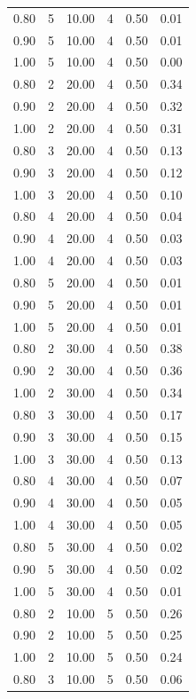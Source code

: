 \documentclass[12pt]{article}
\begin{document}
{\begin{longtable}{cccccc}
  0.80 &   5 & 10.00 &   4 & 0.50 & 0.01 \\ 
  0.90 &   5 & 10.00 &   4 & 0.50 & 0.01 \\ 
  1.00 &   5 & 10.00 &   4 & 0.50 & 0.00 \\ 
  0.80 &   2 & 20.00 &   4 & 0.50 & 0.34 \\ 
  0.90 &   2 & 20.00 &   4 & 0.50 & 0.32 \\ 
  1.00 &   2 & 20.00 &   4 & 0.50 & 0.31 \\ 
  0.80 &   3 & 20.00 &   4 & 0.50 & 0.13 \\ 
  0.90 &   3 & 20.00 &   4 & 0.50 & 0.12 \\ 
  1.00 &   3 & 20.00 &   4 & 0.50 & 0.10 \\ 
  0.80 &   4 & 20.00 &   4 & 0.50 & 0.04 \\ 
  0.90 &   4 & 20.00 &   4 & 0.50 & 0.03 \\ 
  1.00 &   4 & 20.00 &   4 & 0.50 & 0.03 \\ 
  0.80 &   5 & 20.00 &   4 & 0.50 & 0.01 \\ 
  0.90 &   5 & 20.00 &   4 & 0.50 & 0.01 \\ 
  1.00 &   5 & 20.00 &   4 & 0.50 & 0.01 \\ 
  0.80 &   2 & 30.00 &   4 & 0.50 & 0.38 \\ 
  0.90 &   2 & 30.00 &   4 & 0.50 & 0.36 \\ 
  1.00 &   2 & 30.00 &   4 & 0.50 & 0.34 \\ 
  0.80 &   3 & 30.00 &   4 & 0.50 & 0.17 \\ 
  0.90 &   3 & 30.00 &   4 & 0.50 & 0.15 \\ 
  1.00 &   3 & 30.00 &   4 & 0.50 & 0.13 \\ 
  0.80 &   4 & 30.00 &   4 & 0.50 & 0.07 \\ 
  0.90 &   4 & 30.00 &   4 & 0.50 & 0.05 \\ 
  1.00 &   4 & 30.00 &   4 & 0.50 & 0.05 \\ 
  0.80 &   5 & 30.00 &   4 & 0.50 & 0.02 \\ 
  0.90 &   5 & 30.00 &   4 & 0.50 & 0.02 \\ 
  1.00 &   5 & 30.00 &   4 & 0.50 & 0.01 \\ 
  0.80 &   2 & 10.00 &   5 & 0.50 & 0.26 \\ 
  0.90 &   2 & 10.00 &   5 & 0.50 & 0.25 \\ 
  1.00 &   2 & 10.00 &   5 & 0.50 & 0.24 \\ 
  0.80 &   3 & 10.00 &   5 & 0.50 & 0.06 \\ 

\end{longtable}}
\end{document}

